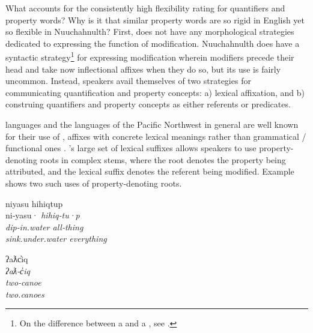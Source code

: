 What accounts for the consistently high flexibility rating for quantifiers and property words? Why is it that similar property words are so rigid in English yet so flexible in Nuuchahnulth? First,  does not have any morphological strategies dedicated to expressing the function of modification. Nuuchahnulth does have a syntactic strategy\footnote{On the difference between a  and a , see \textcites[537]{Croft2014}[380]{Croft2016}.} for expressing modification wherein modifiers precede their head and take now inflectional affixes when they do so, but its use is fairly uncommon. Instead, speakers avail themselves of two strategies for communicating quantification and property concepts: a) lexical affixation, and b) construing quantifiers and property concepts as either referents or predicates.

 languages and the languages of the Pacific Northwest in general are well known for their use of , affixes with concrete lexical meanings rather than grammatical / functional ones \parencite{Mithun1997}. 's large set of lexical suffixes allows speakers to use property-denoting roots in complex stems, where the root denotes the property being attributed, and the lexical suffix denotes the referent being modified. Example  shows two such uses of property-denoting roots.

\begin{exe}
  \ex\label{ex:4.1}
  \begin{xlist}

    \ex\label{ex:4.1a}
    \gllll niyasu           hihiqtup\\
           ni‑yasu·         \em{hihiq}‑tu·p\\
           dip‑in.water     \em{all}‑thing\\
           sink.under.water everything\\

    \ex\label{ex:4.1b}
    \gllll ʔaƛc̓iq\\
           \em{ʔaƛ}‑c̓iq\\
           \em{two}‑canoe\\
           two.canoes\\

  \end{xlist}
\end{exe}

